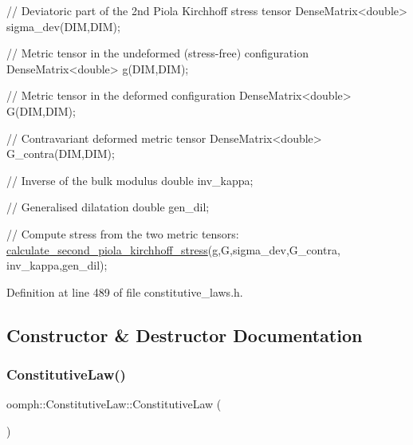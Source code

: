 \begin{DoxyEnumerate}
\begin{DoxyCode}
\textcolor{comment}{// Deviatoric part of the 2nd Piola Kirchhoff stress tensor}
DenseMatrix<double> sigma\_dev(DIM,DIM);

\textcolor{comment}{// Metric tensor in the undeformed (stress-free) configuration}
DenseMatrix<double> g(DIM,DIM);

\textcolor{comment}{// Metric tensor in the deformed  configuration}
DenseMatrix<double> G(DIM,DIM);

\textcolor{comment}{// Contravariant deformed metric tensor}
DenseMatrix<double> G\_contra(DIM,DIM);

\textcolor{comment}{// Inverse of the bulk modulus}
\textcolor{keywordtype}{double} inv\_kappa;

\textcolor{comment}{// Generalised dilatation}
\textcolor{keywordtype}{double} gen\_dil;

\textcolor{comment}{// Compute stress from the two metric tensors:}
\hyperlink{classoomph_1_1ConstitutiveLaw_a93527d910de908035feb8f41b0401065}{calculate\_second\_piola\_kirchhoff\_stress}(g,G,sigma\_dev,G\_contra,
      inv\_kappa,gen\_dil);
\end{DoxyCode}
 
\end{DoxyEnumerate}

Definition at line 489 of file constitutive\+\_\+laws.\+h.



\subsection{Constructor \& Destructor Documentation}
\mbox{\label{classoomph_1_1ConstitutiveLaw_a864c36413e8ea31e63552f3db3b97a2f}} 
\subsubsection{\texorpdfstring{Constitutive\+Law()}{ConstitutiveLaw()}}
{\footnotesize\ttfamily oomph\+::\+Constitutive\+Law\+::\+Constitutive\+Law (\begin{DoxyParamCaption}{ }\end{DoxyParamCaption})\hspace{0.3cm}{\ttfamily [inline]}}



